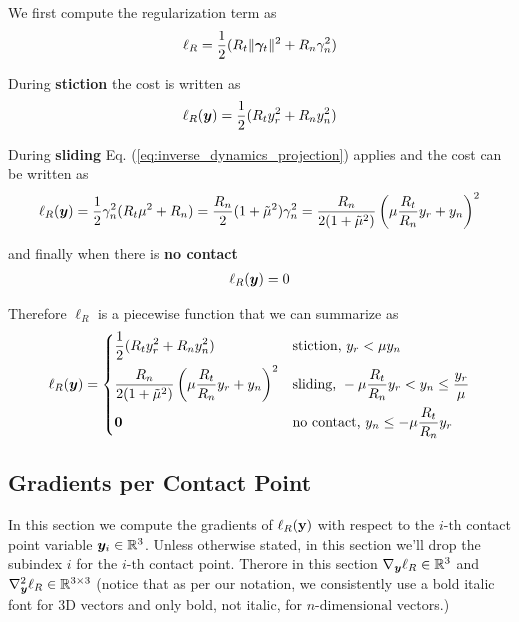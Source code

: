 We first compute the regularization term as
\begin{eqnarray}
	\ell_R = \frac{1}{2}(R_t\Vert{\bm\gamma}_t\Vert^2+R_n\gamma_n^2)
\end{eqnarray}

During \textbf{stiction} the cost is written as
\begin{eqnarray}
	\ell_R({\bm{y}}) = \frac{1}{2}(R_t y_r^2+R_n y_n^2)
\end{eqnarray}

During \textbf{sliding} Eq. (\ref{eq:inverse_dynamics_projection}) applies and
the cost can be written as
\begin{eqnarray}
	\ell_R({\bm{y}}) =
	\frac{1}{2}\gamma_n^2(R_t\mu^2+R_n)=\frac{R_n}{2}(1+\tilde\mu^2)\gamma_n^2=\frac{R_n}{2(1+\tilde\mu^2)}\left(\mu\frac{R_t}{R_n}y_r+y_n\right)^2
\end{eqnarray}

and finally when there is \textbf{no contact}
\begin{eqnarray}
	\ell_R({\bm{y}}) = 0
\end{eqnarray}

Therefore $\ell_R$ is a piecewise function that we can summarize as
\begin{equation}
	\ell_R(\vf{y}) = 
\begin{dcases}
	\frac{1}{2}(R_t y_r^2+R_n y_n^2) & \text{stiction, } y_r < \mu y_n\\
	\frac{R_n}{2(1+\tilde\mu^2)}\left(\mu\frac{R_t}{R_n}y_r+y_n\right)^2 & \text{sliding, } -\mu \frac{R_t}{R_n} y_r < y_n \leq \frac{y_r}{\mu}\\
    \vf{0} & \text{no contact, } y_n \leq -\mu \frac{R_t}{R_n} y_r
\end{dcases}	  
	\label{eq:ell_R_piecewise}
\end{equation}

\subsection{Gradients per Contact Point}
In this section we compute the gradients of $\ell_R({\mathbf{y}})$ with respect to the
$i\text{-th}$ contact point variable ${\bm{y}}_i\in\mathbb{R}^3$. Unless otherwise
stated, in this section we'll drop the subindex $i$ for the $i\text{-th}$
contact point. Therore in this section $\nabla_{\bm{y}}\ell_R\in\mathbb{R}^3$ and
$\nabla_{\bm{y}}^2\ell_R\in\mathbb{R}^{3\times 3}$ (notice that as per our
notation, we consistently use a bold italic font for 3D vectors and only bold,
not italic, for $n\text{-dimensional}$ vectors.)

